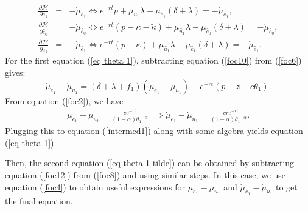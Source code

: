 \documentclass[12pt]{article} %
\theoremstyle{definition}
\begin{document}
\begin{appendix}
\begin{eqnarray}
       \frac{\partial \mathcal{H}}{\partial e_1}  &=& -\dot{\mu}_{e_1} \iff e^{-rt}p+\mu_{u_1} \lambda -\mu_{e_1}(\delta + \lambda) = -\dot{\mu}_{e_1}, \label{foc10}\\
        \frac{\partial \mathcal{H}}{\partial \tilde{e_0}}  &=& -\dot{\mu}_{\tilde{e_0}} \iff e^{-rt}(p-\kappa-\tilde{\kappa})+\mu_{\tilde{u_1}} \lambda -\mu_{\tilde{e_0}}(\delta + \lambda) = -\dot{\mu}_{\tilde{e_0}}, \label{foc11}\\
         \frac{\partial \mathcal{H}}{\partial \tilde{e_1}}  &=& -\dot{\mu}_{\tilde{e_1}} \iff e^{-rt}(p-\kappa)+\mu_{\tilde{u_1}} \lambda -\mu_{\tilde{e_1}}(\delta + \lambda) = -\dot{\mu}_{\tilde{e_1}}. \label{foc12}
\end{eqnarray}
For the first equation (\ref{eq theta 1}), subtracting equation (\ref{foc10}) from (\ref{foc6}) gives:
\begin{equation}
   \dot{\mu}_{e_1}-\dot{\mu}_{u_1}=(\delta + \lambda+f_1)(\mu_{e_1}-\mu_{u_1})-e^{-rt}(p-z+c\theta_1). \label{intermed1}
\end{equation}
From equation (\ref{foc2}), we have
\begin{eqnarray*}
 \mu_{e_1}-\mu_{u_1} = \frac{ce^{-rt}}{(1-\alpha){\theta_1}^{-\alpha}} \implies  \dot{\mu}_{e_1}-\dot{\mu}_{u_1} = \frac{-cre^{-rt}}{(1-\alpha){\theta_1}^{-\alpha}}.
\end{eqnarray*}
Plugging this to equation (\ref{intermed1}) along with some algebra yields equation (\ref{eq theta 1}). 

Then, the second equation (\ref{eq theta 1 tilde}) can be obtained by subtracting equation (\ref{foc12}) from (\ref{foc8}) and using similar steps. In this case, we use equation (\ref{foc4}) to obtain useful expressions for $\mu_{\tilde{e_1}}-\mu_{\tilde{u_1}}$ and $\dot{\mu}_{\tilde{e_1}}-\dot{\mu}_{\tilde{u_1}}$ to get the final equation. 


\end{appendix}
\end{document}
